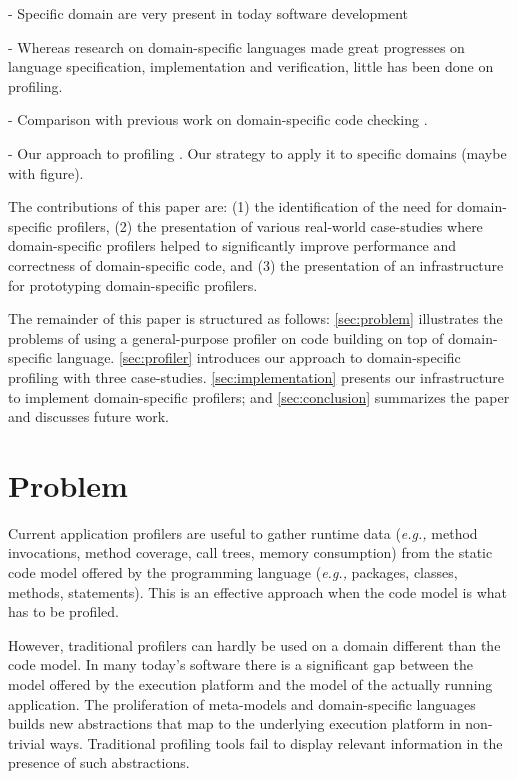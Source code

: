 \documentclass[runningheads]{llncs}
\newcommand{\eg}{\emph{e.g.,}\xspace}
\newcommand{\seclabel}[1]{\label{sec:#1}}
\begin{document}
- Specific domain are very present in today software development

- Whereas research on domain-specific languages made great progresses on language specification, implementation and verification, little has been done on profiling.

- Comparison with previous work on domain-specific code checking \cite{Reng10b}.

- Our approach to profiling \cite{Berg10c}. Our strategy to apply it to specific domains (maybe with figure).

The contributions of this paper are: (1) the identification of the need for domain-specific profilers, (2) the presentation of various real-world case-studies where domain-specific profilers helped to significantly improve performance and correctness of domain-specific code, and (3) the presentation of an infrastructure for prototyping domain-specific profilers.

The remainder of this paper is structured as follows: \autoref{sec:problem} illustrates the problems of using a general-purpose profiler on code building on top of domain-specific language. \autoref{sec:profiler} introduces our approach to domain-specific profiling with three case-studies. \autoref{sec:implementation} presents our infrastructure to implement domain-specific profilers; and \autoref{sec:conclusion} summarizes the paper and discusses future work.

\section{Problem}\seclabel{problem}

Current application profilers are useful to gather runtime data (\eg method invocations, method coverage, call trees, memory consumption) from the static code model offered by the programming language (\eg packages, classes, methods, statements). This is an effective approach when the code model is what has to be profiled. 

However, traditional profilers can hardly be used on a domain different than the code model. In many today's software there is a significant gap between the model offered by the execution platform and the model of the actually running application. The proliferation of meta-models and domain-specific languages builds new abstractions that map to the underlying execution platform in non-trivial ways. Traditional profiling tools fail to display relevant information in the presence of such abstractions.
\end{document}
